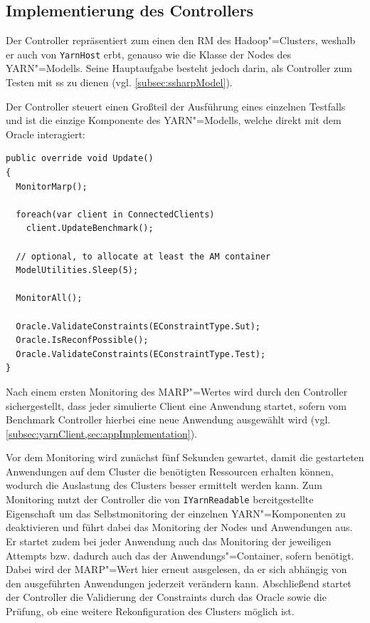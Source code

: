 \subsection{Implementierung des Controllers}
\label{subsec:yarnController}

Der Controller repräsentiert zum einen den \ac{RM} des Hadoop"=Clusters, weshalb er auch von \texttt{YarnHost} erbt, genauso wie die Klasse der Nodes des \ac{YARN}"=Modells.
Seine Hauptaufgabe besteht jedoch darin, als Controller zum Testen mit \ac{ss} zu dienen (vgl. \cref{subsec:ssharpModel}).

Der Controller steuert einen Großteil der Ausführung eines einzelnen Testfalls und ist die einzige Komponente des \ac{YARN}"=Modells, welche direkt mit dem Oracle interagiert:

\begin{lstlisting}[label=lst:controllerUpdate,style=cs,
caption={[Update()"=Methode des Controllers]
    \texttt{Update()}"=Methode des Controllers (gekürzt).
    Eine ausführliche Beschreibung des Ablaufs der Ausführung eines Testfalls findet sich in \cref{subsec:simulationStep}.}]
public override void Update()
{
  MonitorMarp();
  
  foreach(var client in ConnectedClients)
    client.UpdateBenchmark();
  
  // optional, to allocate at least the AM container
  ModelUtilities.Sleep(5);
  
  MonitorAll();
  
  Oracle.ValidateConstraints(EConstraintType.Sut);
  Oracle.IsReconfPossible();
  Oracle.ValidateConstraints(EConstraintType.Test);
}
\end{lstlisting}

Nach einem ersten Monitoring des \ac{MARP}"=Wertes wird durch den Controller sichergestellt, dass jeder simulierte Client eine Anwendung startet, sofern vom Benchmark Controller hierbei eine neue Anwendung ausgewählt wird (vgl. \cref{subsec:yarnClient,sec:appImplementation}).

Vor dem Monitoring wird zunächst fünf Sekunden gewartet, damit die gestarteten Anwendungen auf dem Cluster die benötigten Ressourcen erhalten können, wodurch die Auslastung des Clusters besser ermittelt werden kann.
Zum Monitoring nutzt der Controller die von \texttt{IYarnReadable} bereitgestellte Eigenschaft um das Selbstmonitoring der einzelnen \ac{YARN}"=Komponenten zu deaktivieren und führt dabei das Monitoring der Nodes und Anwendungen aus.
Er startet zudem bei jeder Anwendung auch das Monitoring der jeweiligen Attempts bzw. dadurch auch das der Anwendungs"=Container, sofern benötigt.
Dabei wird der \ac{MARP}"=Wert hier erneut ausgelesen, da er sich abhängig von den ausgeführten Anwendungen jederzeit verändern kann.
Abschließend startet der Controller die Validierung der Constraints durch das Oracle sowie die Prüfung, ob eine weitere Rekonfiguration des Clusters möglich ist.

